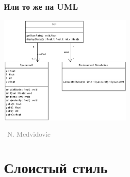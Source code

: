 \documentclass[xetex,mathserif,serif]{beamer}
\newcommand{\attribution}[1] {
    \vspace{-5mm}\begin{flushright}\begin{scriptsize}\textcolor{gray}{\textcopyright\, #1}\end{scriptsize}\end{flushright}
}
\begin{document}
    \begin{frame}
        \frametitle{Или то же на UML}
        \begin{center}
            \includegraphics[width=0.5\textwidth]{objectOrientedLLUML.png}
            \attribution{N. Medvidovic}
        \end{center}
    \end{frame}

    \section{Слоистый стиль}
\end{document}

